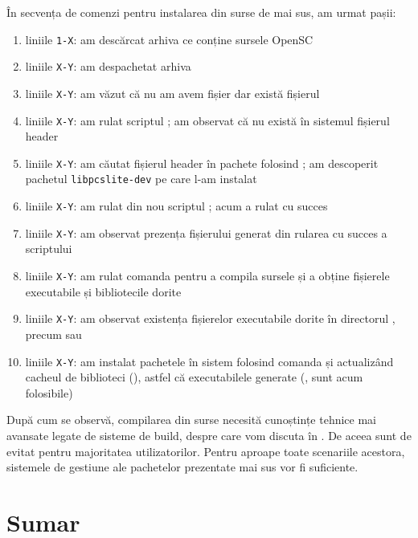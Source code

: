 În secvența de comenzi pentru instalarea din surse de mai sus, am urmat pașii:
\begin{enumerate}
  \item liniile \texttt{1-X}: am descărcat arhiva ce conține sursele OpenSC
  \item liniile \texttt{X-Y}: am despachetat arhiva
  \item liniile \texttt{X-Y}: am văzut că nu am avem fișier  dar există fișierul 
  \item liniile \texttt{X-Y}: am rulat scriptul ; am observat că nu există în sistemul fișierul header 
  \item liniile \texttt{X-Y}: am căutat fișierul header  în pachete folosind ; am descoperit pachetul \texttt{libpcslite-dev} pe care l-am instalat
  \item liniile \texttt{X-Y}: am rulat din nou scriptul ; acum a rulat cu succes
  \item liniile \texttt{X-Y}: am observat prezența fișierului  generat din rularea cu succes a scriptului 
  \item liniile \texttt{X-Y}: am rulat comanda  pentru a compila sursele și a obține fișierele executabile și bibliotecile dorite
  \item liniile \texttt{X-Y}: am observat existența fișierelor executabile dorite în directorul , precum  sau 
  \item liniile \texttt{X-Y}: am instalat pachetele în sistem folosind comanda  și actualizând cacheul de biblioteci (), astfel că executabilele generate (,  sunt acum folosibile)
\end{enumerate}

După cum se observă, compilarea din surse necesită cunoștințe tehnice mai avansate legate de sisteme de build, despre care vom discuta în . De aceea sunt de evitat pentru majoritatea utilizatorilor. Pentru aproape toate scenariile acestora, sistemele de gestiune ale pachetelor prezentate mai sus vor fi suficiente.

\section{Sumar}
\label{sec:package:summary}

